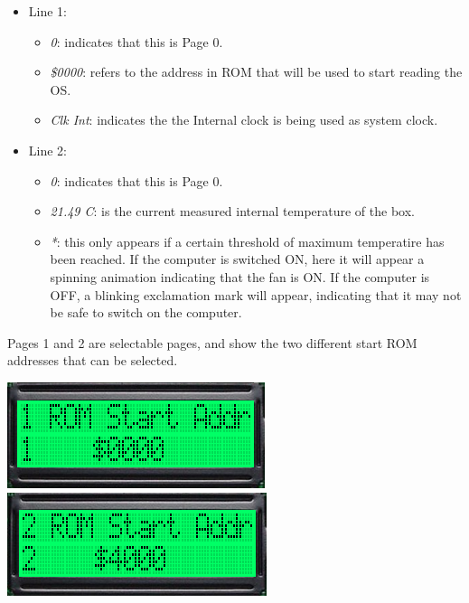         \begin{itemize}
            \item Line 1:
            \begin{itemize}
                \item \textit{0}: indicates that this is Page 0.
                \item \textit{\$0000}: refers to the address in ROM that will be
                    used to start reading the OS.
                \item \textit{Clk Int}: indicates the the Internal clock is
                    being used as system clock.
            \end{itemize}
            \item Line 2:
            \begin{itemize}
                \item \textit{0}: indicates that this is Page 0.
                \item \textit{21.49 C}: is the current measured internal
                    temperature of the box.
                \item \textit{*}: this only appears if a certain threshold of
                    maximum temperatire has been reached. If the computer is
                    switched ON, here it will appear a spinning animation
                    indicating that the fan is ON. If the computer is OFF, a
                    blinking exclamation mark will appear, indicating that it
                    may not be safe to switch on the computer.
            \end{itemize}
        \end{itemize}

        Pages 1 and 2 are selectable pages, and show the two different start ROM
        addresses that can be selected.

        \begin{center}
            \includegraphics[scale=0.7]{images/dastaZ80_ControlPanel_Page1.png}
            \includegraphics[scale=0.7]{images/dastaZ80_ControlPanel_Page2.png}
        \end{center}

